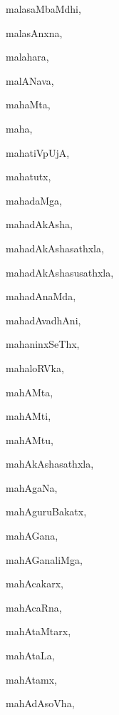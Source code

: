 \begin{multicols}{3}
{\noindent
{malasaMbaMdhi}, \pageref{malasaMbaMdhi}

\noindent
{malasAnxna}, \pageref{malasAnxna}

\noindent
{malahara}, \pageref{malahara}

\noindent
{malANava}, \pageref{malANava}

\noindent
{mahaMta}, \pageref{mahaMta}

\noindent
{maha}, \pageref{maha}

\noindent
{mahatiVpUjA}, \pageref{mahatiVpUjA}

\noindent
{mahatutx}, \pageref{mahatutx}

\noindent
{mahadaMga}, \pageref{mahadaMga}

\noindent
{mahadAkAsha}, \pageref{mahadAkAsha}

\noindent
{mahadAkAshasathxla}, \pageref{mahadAkAshasathxla}

\noindent
{mahadAkAshasusathxla}, \pageref{mahadAkAshasusathxla}

\noindent
{mahadAnaMda}, \pageref{mahadAnaMda}

\noindent
{mahadAvadhAni}, \pageref{mahadAvadhAni}

\noindent
{mahaninxSeThx}, \pageref{mahaninxSeThx}

\noindent
{mahaloRVka}, \pageref{mahaloRVka}

\noindent
{mahAMta}, \pageref{mahAMta}

\noindent
{mahAMti}, \pageref{mahAMti}

\noindent
{mahAMtu}, \pageref{mahAMtu}

\noindent
{mahAkAshasathxla}, \pageref{mahAkAshasathxla}

\noindent
{mahAgaNa}, \pageref{mahAgaNa}

\noindent
{mahAguruBakatx}, \pageref{mahAguruBakatx}

\noindent
{mahAGana}, \pageref{mahAGana}

\noindent
{mahAGanaliMga}, \pageref{mahAGanaliMga}

\noindent
{mahAcakarx}, \pageref{mahAcakarx}

\noindent
{mahAcaRna}, \pageref{mahAcaRna}

\noindent
{mahAtaMtarx}, \pageref{mahAtaMtarx}

\noindent
{mahAtaLa}, \pageref{mahAtaLa}

\noindent
{mahAtamx}, \pageref{mahAtamx}

\noindent
{mahAdAsoVha}, \pageref{mahAdAsoVha}

}
\end{multicols}
